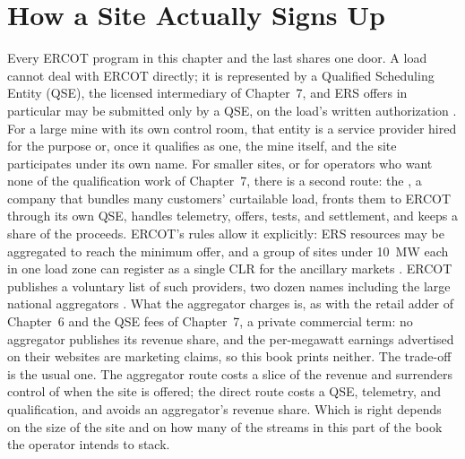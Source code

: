 \section{How a Site Actually Signs Up}
\label{sec:aggregators}

Every ERCOT program in this chapter and the last shares one door. A load cannot deal with ERCOT directly; it is represented by a Qualified Scheduling Entity (QSE), the licensed intermediary of Chapter~7, and ERS offers in particular may be submitted only by a QSE, on the load's written authorization \autocite{ercot2026protocols}. %
For a large mine with its own control room, that entity is a service provider hired for the purpose or, once it qualifies as one, the mine itself, and the site participates under its own name. For smaller sites, or for operators who want none of the qualification work of Chapter~7, there is a second route: the , a company that bundles many customers' curtailable load, fronts them to ERCOT through its own QSE, handles telemetry, offers, tests, and settlement, and keeps a share of the proceeds. ERCOT's rules allow it explicitly: ERS resources may be aggregated to reach the minimum offer, and a group of sites under 10~MW each in one load zone can register as a single CLR for the ancillary markets \autocite{ercot2026protocols,ercotgridinsightsdr2025}. %
ERCOT publishes a voluntary list of such providers, two dozen names including the large national aggregators \autocite{ercotdrproviders2025,ercotgridinsightsdr2025}. %
What the aggregator charges is, as with the retail adder of Chapter~6 and the QSE fees of Chapter~7, a private commercial term: no aggregator publishes its revenue share, and the per-megawatt earnings advertised on their websites are marketing claims, so this book prints neither. %
The trade-off is the usual one. The aggregator route costs a slice of the revenue and surrenders control of when the site is offered; the direct route costs a QSE, telemetry, and qualification, and avoids an aggregator's revenue share. Which is right depends on the size of the site and on how many of the streams in this part of the book the operator intends to stack.

